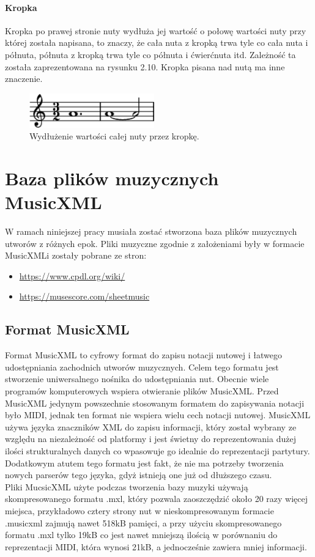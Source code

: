\documentclass[printmode, eng, openany]{mgr}
\newcommand\tab[1][1cm]{\hspace*{#1}}
\begin{document}
\subsubsection{Kropka}
\tab Kropka po prawej stronie nuty wydłuża jej wartość o połowę wartości nuty przy której została napisana, to znaczy, że cała nuta z kropką trwa tyle co cała nuta i półnuta, półnuta z kropką trwa tyle co półnuta i ćwierćnuta itd. Zależność ta została zaprezentowana na rysunku 2.10. Kropka pisana nad nutą ma inne znaczenie.\cite{wart}

\begin{figure}[!htb]
\centering
\includegraphics[width=5.4cm]{kropka}
\caption{Wydłużenie wartości całej nuty przez kropkę.}
\end{figure}

\chapter{Baza plików muzycznych MusicXML}
\tab W ramach niniejszej pracy musiała zostać stworzona baza plików muzycznych utworów z różnych epok. Pliki muzyczne zgodnie z założeniami były w formacie MusicXML\linebreak i zostały pobrane ze stron:
\begin{itemize}
\item \url{https://www.cpdl.org/wiki/}
\item \url{https://musescore.com/sheetmusic}
\end{itemize}
\section{Format MusicXML}
\tab Format MusicXML to cyfrowy format do zapisu notacji nutowej i łatwego udostępniania zachodnich utworów muzycznych. Celem tego formatu jest stworzenie uniwersalnego nośnika do udostępniania nut. Obecnie wiele programów komputerowych wspiera otwieranie plików MusicXML. Przed MusicXML jedynym powszechnie stosowanym formatem do zapisywania notacji było MIDI, jednak ten format nie wspiera wielu cech notacji nutowej. MusicXML używa języka znaczników XML \cite{xml} do zapisu informacji, który został wybrany ze względu na niezależność od platformy i jest świetny do reprezentowania dużej ilości strukturalnych danych co wpasowuje go idealnie do reprezentacji partytury. Dodatkowym atutem tego formatu jest fakt, że nie ma potrzeby tworzenia nowych parserów tego języka, gdyż istnieją one już od dłuższego czasu.\\
\tab Pliki MucsicXML użyte podczas tworzenia bazy muzyki używają skompresowanego formatu .mxl, który pozwala zaoszczędzić około 20 razy więcej miejsca, przykładowo cztery strony nut w nieskompresowanym formacie .musicxml zajmują nawet 518kB pamięci, a przy użyciu skompresowanego formatu .mxl tylko 19kB co jest nawet mniejszą ilością w porównaniu do reprezentacji MIDI, która wynosi 21kB, a jednocześnie zawiera mniej informacji. \cite{mxml}
\end{document}
